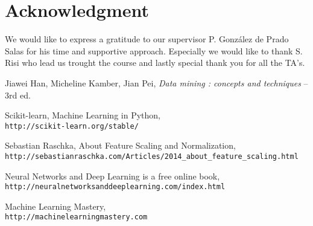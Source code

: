 \documentclass[journal]{IEEEtran}
\begin{document}
\section*{Acknowledgment}


We would like to express a gratitude to our supervisor P. González de Prado Salas for his time and supportive approach. Especially we would like to thank S. Risi who lead us trought the course and lastly special thank you for all the TA's.


\ifCLASSOPTIONcaptionsoff
  \newpage
\fi





%
%
%
\begin{thebibliography}{1}

 
Jiawei Han, Micheline Kamber, Jian Pei, \emph{Data mining : concepts and techniques} – 3rd ed.

Scikit-learn, Machine Learning in Python,
\\\texttt{http://scikit-learn.org/stable/}

Sebastian Raschka, About Feature Scaling and Normalization,
\\\texttt{http://sebastianraschka.com/Articles/2014\_about\_feature\_scaling.html}

Neural Networks and Deep Learning is a free online book,
\\\texttt{http://neuralnetworksanddeeplearning.com/index.html}

Machine Learning Mastery,
\\\texttt{http://machinelearningmastery.com}


\end{thebibliography}
\end{document}
